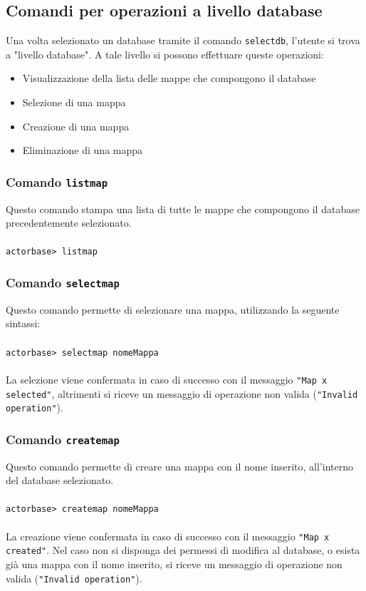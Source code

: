 \documentclass[a4paper]{article}
\begin{document}
	\subsection{Comandi per operazioni a livello database}
	Una volta selezionato un database tramite il comando \texttt{selectdb}, l'utente si trova a "livello database". A tale livello si possono effettuare queste operazioni:
	\begin{itemize}
		\item Visualizzazione della lista delle mappe che compongono il database
		\item Selezione di una mappa
		\item Creazione di una mappa
		\item Eliminazione di una mappa
	\end{itemize}

	\subsubsection{Comando \texttt{listmap}}
	Questo comando stampa una lista di tutte le mappe che compongono il database precedentemente selezionato.
	\\ \\
	\texttt{actorbase>	listmap}

	\subsubsection{Comando \texttt{selectmap}}
	Questo comando permette di selezionare una mappa, utilizzando la seguente sintassi:
	\\ \\
	\texttt{actorbase>	selectmap nomeMappa}
	\\ \\
	La selezione viene confermata in caso di successo con il messaggio \texttt{"Map x selected"}, altrimenti si riceve un messaggio di operazione non valida (\texttt{"Invalid operation"}).

	\subsubsection{Comando \texttt{createmap}}
	Questo comando permette di creare una mappa con il nome inserito, all'interno del database selezionato.
	\\ \\
	\texttt{actorbase>	createmap nomeMappa}
	\\ \\
	La creazione viene confermata in caso di successo con il messaggio \texttt{"Map x created"}. Nel caso non si disponga dei permessi di modifica al database, o esista già una mappa con il nome inserito, si riceve un messaggio di operazione non valida (\texttt{"Invalid operation"}).
\end{document}
